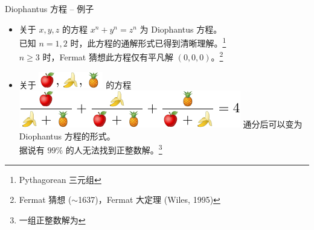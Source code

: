 \documentclass{../pkslide}
\begin{document}
\begin{frame}{Diophantus 方程 -- 例子}
  \begin{examples}[Diophantus 方程]
    \begin{itemize}
      \item<2-> 关于 $x, y, z$ 的方程 $x^n + y^n = z^n$ 为 Diophantus 方程。\\
        已知 $n = 1, 2$ 时，此方程的通解形式已得到清晰理解。\footnote<2->{Pythagorean 三元组}\\
        \-\hspace{2em} $n \ge 3$ 时，Fermat 猜想此方程仅有平凡解 $(0, 0, 0)$。\footnote<2->{Fermat 猜想 ($\sim$1637)，Fermat 大定理 (Wiles, 1995)}
      \item<3-> 关于 \includegraphics[align = c]{pics/fruits.pdf} 的方程 \includegraphics[align = c]{pics/fruits_equation.pdf} 通分后可以变为 Diophantus 方程的形式。\\
        据说有 $99 \%$ 的人无法找到正整数解。\footnote<3->{一组正整数解为}
    \end{itemize}
  \end{examples}
  
\end{frame}
\end{document}
